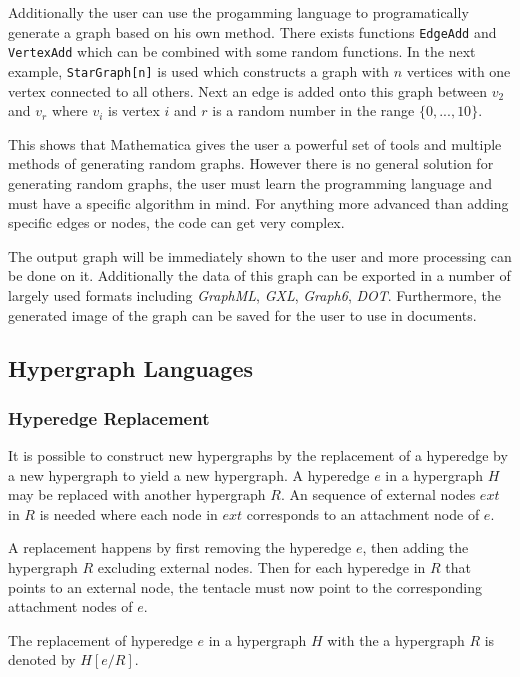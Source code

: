 \documentclass{article}
\newcommand{\code}[1]{\texttt{#1}}
\begin{document}
    Additionally the user can use the progamming language to programatically generate a graph based on his own method. There exists functions \code{EdgeAdd} and \code{VertexAdd} which can be combined with some random functions. In the next example, \code{StarGraph[n]} is used which constructs a graph with $n$ vertices with one vertex connected to all others. Next an edge is added onto this graph between $v_2$ and $v_r$ where $v_i$ is vertex $i$ and $r$ is a random number in the range $\{0,...,10\}$.

    

    This shows that Mathematica gives the user a powerful set of tools and multiple methods of generating random graphs. However there is no general solution for generating random graphs, the user must learn the programming language and must have a specific algorithm in mind. For anything more advanced than adding specific edges or nodes, the code can get very complex.

    The output graph will be immediately shown to the user and more processing can be done on it. Additionally the data of this graph can be exported in a number of largely used formats including \emph{GraphML}, \emph{GXL}, \emph{Graph6}, \emph{DOT}. Furthermore, the generated image of the graph can be saved for the user to use in documents.

\subsection{Hypergraph Languages}
  \subsubsection{Hyperedge Replacement}

    It is possible to construct new hypergraphs by the replacement of a hyperedge by a new hypergraph to yield a new hypergraph. A hyperedge $e$ in a hypergraph $H$ may be replaced with another hypergraph $R$. An sequence of external nodes $ext$ in $R$ is needed where each node in $ext$ corresponds to an attachment node of $e$.

    A replacement happens by first removing the hyperedge $e$, then adding the hypergraph $R$ excluding external nodes. Then for each hyperedge in $R$ that points to an external node, the tentacle must now point to the corresponding attachment nodes of $e$.

    The replacement of hyperedge $e$ in a hypergraph $H$ with the a hypergraph $R$ is denoted by $H[e/R]$. 
\end{document}
